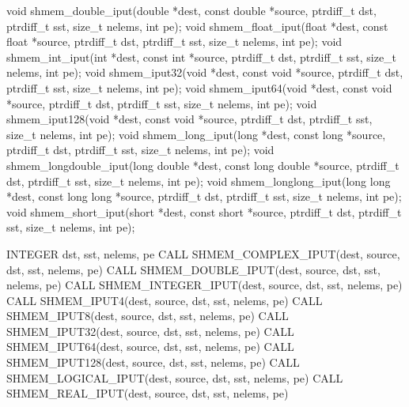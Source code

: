 \label{subsec:shmem_iput}
\synC
void shmem_double_iput(double *dest, const double *source, ptrdiff_t dst, ptrdiff_t sst, size_t nelems, int pe);
void shmem_float_iput(float *dest, const float *source, ptrdiff_t dst, ptrdiff_t sst, size_t nelems, int pe);
void shmem_int_iput(int *dest, const int *source, ptrdiff_t dst, ptrdiff_t sst, size_t nelems, int pe);
void shmem_iput32(void *dest, const void *source, ptrdiff_t dst, ptrdiff_t sst, size_t nelems, int pe);
void shmem_iput64(void *dest, const void *source, ptrdiff_t dst, ptrdiff_t sst, size_t nelems, int pe);
void shmem_iput128(void *dest, const void *source, ptrdiff_t dst, ptrdiff_t sst, size_t nelems, int pe);
void shmem_long_iput(long *dest, const long *source, ptrdiff_t dst, ptrdiff_t sst, size_t nelems, int pe);
void shmem_longdouble_iput(long double *dest, const long double *source, ptrdiff_t dst, ptrdiff_t sst, size_t nelems, int pe);
void shmem_longlong_iput(long long *dest, const long long *source, ptrdiff_t dst, ptrdiff_t sst, size_t nelems, int pe);
void shmem_short_iput(short *dest, const short *source, ptrdiff_t dst, ptrdiff_t sst, size_t nelems, int pe); %
\synF   %

INTEGER dst, sst, nelems, pe
CALL SHMEM_COMPLEX_IPUT(dest, source, dst, sst, nelems, pe)
CALL SHMEM_DOUBLE_IPUT(dest, source, dst, sst, nelems, pe)
CALL SHMEM_INTEGER_IPUT(dest, source, dst, sst, nelems, pe)
CALL SHMEM_IPUT4(dest, source, dst, sst, nelems, pe)
CALL SHMEM_IPUT8(dest, source, dst, sst, nelems, pe)
CALL SHMEM_IPUT32(dest, source, dst, sst, nelems, pe)
CALL SHMEM_IPUT64(dest, source, dst, sst, nelems, pe)
CALL SHMEM_IPUT128(dest, source, dst, sst, nelems, pe)
CALL SHMEM_LOGICAL_IPUT(dest, source, dst, sst, nelems, pe)
CALL SHMEM_REAL_IPUT(dest, source, dst, sst, nelems, pe) %

